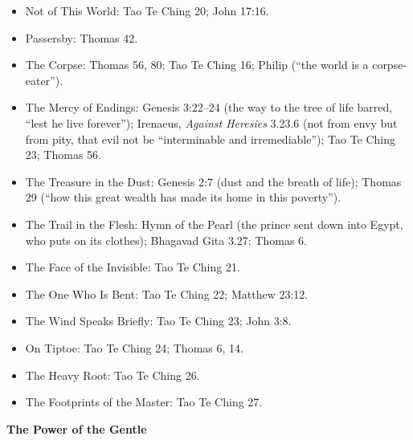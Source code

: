 \documentclass[10pt, openright]{book}
\providecommand{\tightlist}{\setlength{\itemsep}{0pt}\setlength{\parskip}{0pt}}
\begin{document}
\begin{itemize}
\tightlist
\item
  Not of This World: Tao Te Ching 20; John 17:16.
\item
  Passersby: Thomas 42.
\item
  The Corpse: Thomas 56, 80; Tao Te Ching 16; Philip (``the world is a
  corpse-eater'').
\item
  The Mercy of Endings: Genesis 3:22--24 (the way to the tree of life
  barred, ``lest he live forever''); Irenaeus, \emph{Against Heresies}
  3.23.6 (not from envy but from pity, that evil not be ``interminable
  and irremediable''); Tao Te Ching 23; Thomas 56.
\item
  The Treasure in the Dust: Genesis 2:7 (dust and the breath of life);
  Thomas 29 (``how this great wealth has made its home in this
  poverty'').
\item
  The Trail in the Flesh: Hymn of the Pearl (the prince sent down into
  Egypt, who puts on its clothes); Bhagavad Gita 3.27; Thomas 6.
\item
  The Face of the Invisible: Tao Te Ching 21.
\item
  The One Who Is Bent: Tao Te Ching 22; Matthew 23:12.
\item
  The Wind Speaks Briefly: Tao Te Ching 23; John 3:8.
\item
  On Tiptoe: Tao Te Ching 24; Thomas 6, 14.
\item
  The Heavy Root: Tao Te Ching 26.
\item
  The Footprints of the Master: Tao Te Ching 27.
\end{itemize}

\textbf{The Power of the Gentle}
\end{document}
